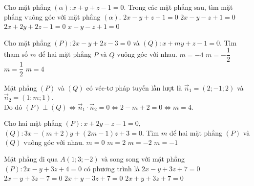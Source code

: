 \begin{ex}
	Cho mặt phẳng $(\alpha)\colon x+y+z-1=0$. Trong các mặt phẳng sau, tìm mặt phẳng vuông góc với mặt phẳng $(\alpha)$.
	\choice
	{$2x-y+z+1=0$}
	{\True $2x-y-z+1=0$}
	{$2x+2y+2z-1=0$}
	{$x-y-z+1=0$}
\end{ex}
\begin{ex}%
	Cho mặt phẳng $(P)\colon 2x-y+2z-3=0$ và $(Q) \colon x+my+z-1=0$. Tìm tham số $m$ để hai mặt phẳng $P$ và $Q$ vuông góc với nhau.
	\choice
	{$m=-4$}
	{$m=- \dfrac{1}{2}$}
	{$m=\dfrac{1}{2}$}
	{\True $m=4$}
	\loigiai
	{ Mặt phẳng $(P)$ và $(Q)$ có véc-tơ pháp tuyến lần lượt là $\overrightarrow{n}_1=(2;-1;2)$ và $\overrightarrow{n}_2=(1;m;1)$. \\
		Do đó $(P) \perp (Q) \Leftrightarrow \overrightarrow{n}_1 \cdot \overrightarrow{n}_2=0 \Leftrightarrow 2-m+2=0 \Leftrightarrow m=4$.
		
	}
\end{ex}

\begin{ex}
	Cho hai mặt phẳng $(P)\colon x+2y-z-1=0$, $(Q)\colon 3x-(m+2)y+(2m-1)z+3=0$. Tìm $m$ để hai mặt phẳng $(P)$ và $(Q)$ vuông góc với nhau.
	\choice
	{\True $m=0$}
	{$m=2$}
	{$m=-2$}
	{$m=-1$}
\end{ex}
\begin{ex}%
	Mặt phẳng đi qua $A(1;3;-2)$ và song song với mặt phẳng $(P) \colon 2x-y+3z+4=0$ có phương trình là
	\choice
	{\True $2x-y+3z+7=0$}
	{$2x-y+3z-7=0$}
	{$2x+y-3z+7=0$}
	{$2x+y+3z+7=0$}
\end{ex}

